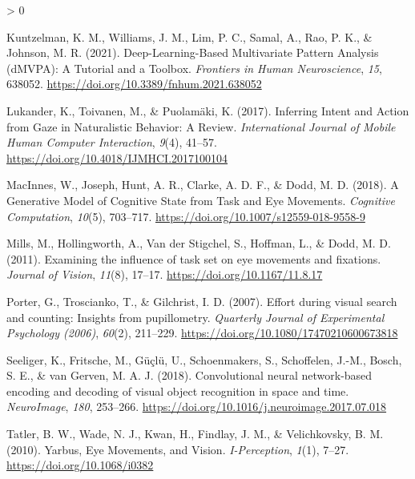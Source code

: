 \documentclass[
  english,
  man, donotrepeattitle,floatsintext]{apa6}
\newlength{\cslhangindent}
\newenvironment{CSLReferences}[2] %
 {%
  \setlength{\parindent}{0pt}
  \ifodd #1 \everypar{\setlength{\hangindent}{\cslhangindent}}\ignorespaces\fi
  \ifnum #2 > 0
  \setlength{\parskip}{#2\baselineskip}
  \fi
 }%
 {}
\begin{document}
\begin{CSLReferences}{1}{0}
\leavevmode\hypertarget{ref-kuntzelmanDeepLearningBasedMultivariatePattern2021}{}%
Kuntzelman, K. M., Williams, J. M., Lim, P. C., Samal, A., Rao, P. K., \& Johnson, M. R. (2021). Deep-{Learning}-{Based Multivariate Pattern Analysis} ({dMVPA}): {A Tutorial} and a {Toolbox}. \emph{Frontiers in Human Neuroscience}, \emph{15}, 638052. \url{https://doi.org/10.3389/fnhum.2021.638052}

\leavevmode\hypertarget{ref-lukanderInferringIntentAction2017c}{}%
Lukander, K., Toivanen, M., \& Puolamäki, K. (2017). Inferring {Intent} and {Action} from {Gaze} in {Naturalistic Behavior}: {A Review}. \emph{International Journal of Mobile Human Computer Interaction}, \emph{9}(4), 41--57. \url{https://doi.org/10.4018/IJMHCI.2017100104}

\leavevmode\hypertarget{ref-macinnesjosephGenerativeModelCognitive2018a}{}%
MacInnes, W., Joseph, Hunt, A. R., Clarke, A. D. F., \& Dodd, M. D. (2018). A {Generative Model} of {Cognitive State} from {Task} and {Eye Movements}. \emph{Cognitive Computation}, \emph{10}(5), 703--717. \url{https://doi.org/10.1007/s12559-018-9558-9}

\leavevmode\hypertarget{ref-millsExaminingInfluenceTask2011a}{}%
Mills, M., Hollingworth, A., Van der Stigchel, S., Hoffman, L., \& Dodd, M. D. (2011). Examining the influence of task set on eye movements and fixations. \emph{Journal of Vision}, \emph{11}(8), 17--17. \url{https://doi.org/10.1167/11.8.17}

\leavevmode\hypertarget{ref-porterEffortVisualSearch2007}{}%
Porter, G., Troscianko, T., \& Gilchrist, I. D. (2007). Effort during visual search and counting: Insights from pupillometry. \emph{Quarterly Journal of Experimental Psychology (2006)}, \emph{60}(2), 211--229. \url{https://doi.org/10.1080/17470210600673818}

\leavevmode\hypertarget{ref-seeligerConvolutionalNeuralNetworkbased2018a}{}%
Seeliger, K., Fritsche, M., Güçlü, U., Schoenmakers, S., Schoffelen, J.-M., Bosch, S. E., \& van Gerven, M. A. J. (2018). Convolutional neural network-based encoding and decoding of visual object recognition in space and time. \emph{NeuroImage}, \emph{180}, 253--266. \url{https://doi.org/10.1016/j.neuroimage.2017.07.018}

\leavevmode\hypertarget{ref-tatlerYarbusEyeMovements2010a}{}%
Tatler, B. W., Wade, N. J., Kwan, H., Findlay, J. M., \& Velichkovsky, B. M. (2010). Yarbus, {Eye Movements}, and {Vision}. \emph{I-Perception}, \emph{1}(1), 7--27. \url{https://doi.org/10.1068/i0382}


\end{CSLReferences}
\end{document}
